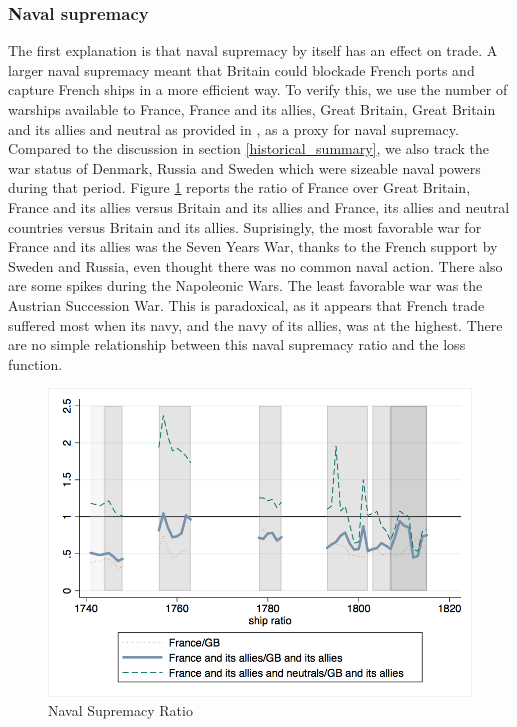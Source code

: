 \documentclass[12pt,a4paper,notitlepage,english]{article}
\begin{document}
\subsubsection{Naval supremacy}
The first explanation is that naval supremacy by itself has an effect on trade.
A larger naval supremacy meant that Britain could blockade French ports and capture French ships in a more efficient way.
To verify this, we use the number of warships available to France, France and its allies, Great Britain, Great Britain and its allies and neutral as provided in \cite{Modelski1988}, as a proxy for naval supremacy.
Compared to the discussion in section \ref{historical_summary}, we also track the war status of Denmark, Russia and Sweden which were sizeable naval powers during that period.
Figure \ref{naval_supremacy_ratios} reports the ratio of France over Great Britain, France and its allies versus Britain and its allies and France, its allies and neutral countries versus Britain and its allies.
Suprisingly, the most favorable war for France and its allies was the Seven Years War, thanks to the French support by Sweden and Russia, even thought there was no common naval action.
There also are some spikes during the Napoleonic Wars.
The least favorable war was the Austrian Succession War. 
This is paradoxical, as it appears that French trade suffered most when its navy, and the navy of its allies, was at the highest.
There are no simple relationship between this naval supremacy ratio and the loss function. 
\begin{center}
\begin{figure}[H]
\caption{Naval Supremacy Ratio}
\label{naval_supremacy_ratios}
\centering
\includegraphics[scale=.51]{naval_supremacy_ratios.png}
\end{figure}
\end{center}
\end{document}
